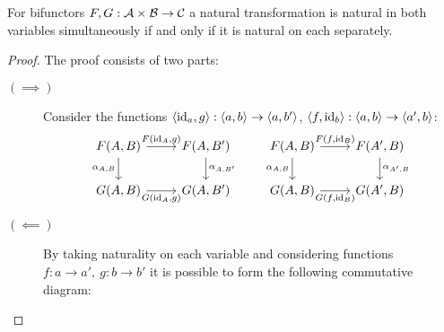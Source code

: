 \begin{theorem}
  For bifunctors $F, G: \mathcal{A} \times \mathcal{B} \to \mathcal{C}$ a natural transformation is natural
  in both variables simultaneously if and only if it is natural on each
  separately.

  \begin{proof}
    The proof consists of two parts:

    \begin{description}
      \item[$(\implies)$] Consider the functions ${\langle \mathrm{id}_a, g \rangle: \langle a, b\rangle
        \to \langle a, b'\rangle}$, ${\langle f, \mathrm{id}_b \rangle: \langle a, b\rangle \to \langle a', b\rangle}$:
        \[\begin{tikzcd}[ampersand replacement=\&]
          {F(A,B)} \& {F(A, B')} \\
          {G(A, B)} \& {G(A,B')}
          \arrow["{F(\id_A, g)}", from=1-1, to=1-2]
          \arrow["{\alpha_{A,B}}"', from=1-1, to=2-1]
          \arrow["{G(\id_A, g)}"', from=2-1, to=2-2]
          \arrow["{\alpha_{A, B'}}", from=1-2, to=2-2]
        \end{tikzcd}
        \qquad
        \begin{tikzcd}[ampersand replacement=\&]
          {F(A, B)} \& {F(A', B)} \\
          {G(A,B)} \& {G(A',B)}
          \arrow["{\alpha_{A, B}}"', from=1-1, to=2-1]
          \arrow["{G(f, \id_{B})}"', from=2-1, to=2-2]
          \arrow["{\alpha_{A', B}}", from=1-2, to=2-2]
          \arrow["{F(f, \id_{B})}", from=1-1, to=1-2]
        \end{tikzcd}\]
      \item[$(\impliedby)$] By taking naturality on each variable and
        considering functions $f:a \to a',\ g:b\to b'$ it is possible to form
        the following commutative diagram:

\end{description}
\end{proof}
\end{theorem}

